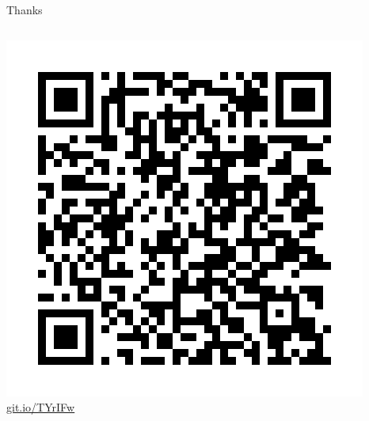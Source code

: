 \documentclass{beamer}
\begin{document}
\begin{frame}{Thanks}
\begin{columns}
    \includegraphics[width=\textwidth]{img/qrlink.png}\\
    \small{\url{git.io/TYrIFw}}
    \vfill
  \end{columns}
\end{frame}
\end{document}
